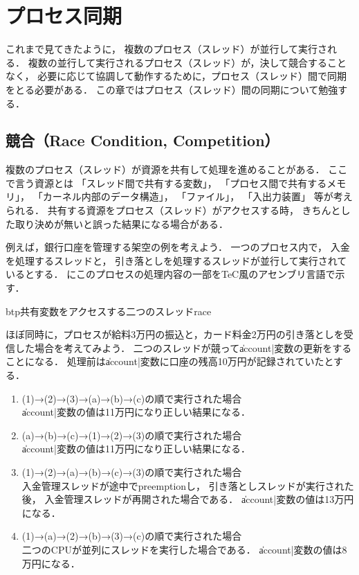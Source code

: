\chapter{プロセス同期}
\label{synchronaization}
これまで見てきたように，
複数のプロセス（スレッド）が並行して実行される．
複数の並行して実行されるプロセス（スレッド）が，決して競合することなく，
必要に応じて協調して動作するために，プロセス（スレッド）間で同期をとる必要がある．
この章ではプロセス（スレッド）間の同期について勉強する．

\section{競合（Race Condition, Competition）}
複数のプロセス（スレッド）が資源を共有して処理を進めることがある．
ここで言う資源とは
「スレッド間で共有する変数」，
「プロセス間で共有するメモリ」，
「カーネル内部のデータ構造」，
「ファイル」，
「入出力装置」
等が考えられる．
共有する資源をプロセス（スレッド）がアクセスする時，
きちんとした取り決めが無いと誤った結果になる場合がある．

例えば，銀行口座を管理する架空の例を考えよう．
一つのプロセス内で，
入金を処理するスレッドと，
引き落としを処理するスレッドが並行して実行されているとする．
にこのプロセスの処理内容の一部をTeC風のアセンブリ言語で示す．

\begin{myfig}{btp}{共有変数をアクセスする二つのスレッド}{race}

\end{myfig}

ほぼ同時に，プロセスが給料3万円の振込と，カード料金2万円の引き落としを受信した場合を考えてみよう．
二つのスレッドが競って\|account|変数の更新をすることになる．
処理前は\|account|変数に口座の残高10万円が記録されていたとする．

\begin{enumerate}
\item (1)→(2)→(3)→(a)→(b)→(c)の順で実行された場合 \\
\|account|変数の値は11万円になり正しい結果になる．

\item (a)→(b)→(c)→(1)→(2)→(3)の順で実行された場合 \\
\|account|変数の値は11万円になり正しい結果になる．

\item (1)→(2)→(a)→(b)→(c)→(3)の順で実行された場合 \\
入金管理スレッドが途中でpreemptionし，
引き落としスレッドが実行された後，
入金管理スレッドが再開された場合である．
\|account|変数の値は13万円になる．

\item (1)→(a)→(2)→(b)→(3)→(c)の順で実行された場合 \\
二つのCPUが並列にスレッドを実行した場合である．
\|account|変数の値は8万円になる．
\end{enumerate}

